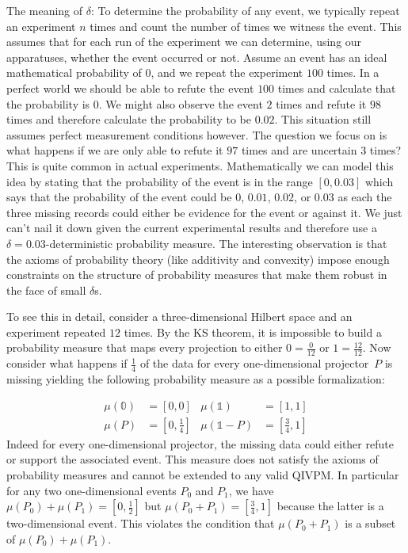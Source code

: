 \documentclass[english,reprint, aps, prl,superscriptaddress, showpacs,
showkeys, longbibliography, amsmath, amssymb, floatfix]{revtex4-1}
\theoremstyle{plain}
\theoremstyle{definition}
\newcommand{\imposs}{\ensuremath{\left[0,0\right]}}
\newcommand{\necess}{\ensuremath{\left[1,1\right]}}
\begin{document}
The meaning of $\delta$: To determine the probability of any event,
we typically repeat an experiment $n$ times and count the number
of times we witness the event. This assumes that for each run of the
experiment we can determine, using our apparatuses, whether the event
occurred or not. Assume an event has an ideal mathematical probability
of $0$, and we repeat the experiment $100$ times. In a perfect world
we should be able to refute the event $100$ times and calculate that
the probability is $0$. We might also observe the event $2$ times
and refute it $98$ times and therefore calculate the probability
to be $0.02$. This situation still assumes perfect measurement conditions
however. The question we focus on is what happens if we are only able
to refute it $97$ times and are uncertain $3$ times? This is quite
common in actual experiments. Mathematically we can model this idea
by stating that the probability of the event is in the range $\left[0,0.03\right]$
which says that the probability of the event could be $0$, $0.01$,
$0.02$, or $0.03$ as each the three missing records could either
be evidence for the event or against it. We just can't nail it down
given the current experimental results and therefore use a $\delta=0.03$-deterministic
probability measure. The interesting observation is that the axioms
of probability theory (like additivity and convexity) impose enough
constraints on the structure of probability measures that make them
robust in the face of small $\delta$s.

To see this in detail, consider a three-dimensional Hilbert space
and an experiment repeated $12$ times. By the KS theorem, it is impossible
to build a probability measure that maps every projection to either
$0=\frac{0}{12}$ or $1=\frac{12}{12}$. Now consider what happens
if $\frac{1}{4}$ of the data for every one-dimensional projector~$P$
is missing yielding the following probability measure as a possible
formalization:

\begin{equation}
\begin{aligned}\mu\left(\mathbb{0}\right) & =\imposs & \mu\left(\mathbb{1}\right) & =\necess\\
\mu\left(P\right) & =\left[0,\tfrac{1}{4}\right] & \mu\left(\mathbb{1}-P\right) & =\left[\tfrac{3}{4},1\right]
\end{aligned}
\end{equation}
Indeed for every one-dimensional projector, the missing data could
either refute or support the associated event. This measure does not
satisfy the axioms of probability measures and cannot be extended
to any valid QIVPM. In particular for any two one-dimensional events
$P_{0}$ and $P_{1}$, we have $\mu\left(P_{0}\right)+\mu\left(P_{1}\right)=\left[0,\tfrac{1}{2}\right]$
but $\mu\left(P_{0}+P_{1}\right)=\left[\tfrac{3}{4},1\right]$ because
the latter is a two-dimensional event. This violates the condition
that $\mu\left(P_{0}+P_{1}\right)$ is a subset of $\mu\left(P_{0}\right)+\mu\left(P_{1}\right)$.
\end{document}
